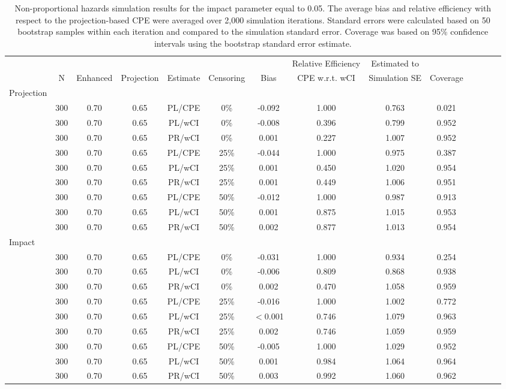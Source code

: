 \documentclass[12pt]{article}
\begin{document}
 
 \begin{table}[ht]
 \caption{Non-proportional hazards simulation results for the impact parameter equal to 0.05.
  The average bias and relative efficiency with respect to the projection-based CPE were averaged over 2,000 simulation iterations. Standard errors were calculated based on 50 bootstrap samples within each iteration and compared to the simulation standard error. Coverage was based on 95\% confidence intervals using the bootstrap standard error estimate. }
\centering
\tiny
\begin{tabular}{lccccccccccccc} \label{NPHsimresultsDelta005}
\vspace{-0.25cm}
   &&&&&& & Relative Efficiency   & Estimated to  &\\
& N & Enhanced &  Projection & Estimate & Censoring &Bias & CPE w.r.t. wCI & Simulation SE & Coverage \\

 \hline
 \hline
  Projection &&&&&&&&& \\
&   300 &0.70 & 0.65 & PL/CPE & 0\% & -0.092 & 1.000 &   0.763 & 0.021 \\ 
& 300 &0.70 & 0.65 & PL/wCI &0\%  & -0.008 & 0.396 & 0.799 & 0.952 \\  
& 300 &0.70 & 0.65 & PR/wCI &0\%  & 0.001 & 0.227 & 1.007 & 0.952 \\ 
\hline
& 300 &0.70 & 0.65 & PL/CPE  &25\% &  -0.044 & 1.000 & 0.975 & 0.387 \\ 
& 300 &0.70 & 0.65 & PL/wCI &25\%  &   0.001 & 0.450 & 1.020 & 0.954 \\ 
& 300 &0.70 & 0.65 & PR/wCI &25\%  &   0.001 & 0.449 & 1.006 & 0.951 \\
\hline
& 300 &0.70 & 0.65 & PL/CPE  &50\%  & -0.012 & 1.000 & 0.987 & 0.913 \\ 
& 300 &0.70 & 0.65 & PL/wCI &50\%  & 0.001 & 0.875 & 1.015 & 0.953 \\
& 300 &0.70 & 0.65 & PR/wCI &50\%  &  0.002 & 0.877 & 1.013 & 0.954 \\  
  \hline
  \hline
  Impact &&&&&&&&& \\
&  300 &0.70 & 0.65 & PL/CPE   &0\%  & -0.031 & 1.000 &  0.934 & 0.254 \\ 
& 300 &0.70 & 0.65 & PL/wCI &0\%  & -0.006 & 0.809 & 0.868 & 0.938 \\ 
& 300 &0.70 & 0.65 & PR/wCI &0\%  & 0.002 & 0.470 & 1.058 & 0.959 \\ 
\hline
&   300 &0.70 & 0.65 & PL/CPE   &25\%  &  -0.016 & 1.000 & 1.002 & 0.772 \\ 
& 300 &0.70 & 0.65 & PL/wCI &25\%  & $<$0.001 & 0.746 & 1.079 & 0.963 \\
& 300 &0.70 & 0.65 & PR/wCI &25\%  & 0.002 & 0.746 & 1.059 & 0.959 \\ 
\hline
& 300 &0.70 & 0.65 & PL/CPE   & 50\%  &  -0.005 & 1.000 & 1.029 & 0.952 \\ 
& 300 &0.70 & 0.65 & PL/wCI &50\% & 0.001 & 0.984 & 1.064 & 0.964 \\ 
& 300 &0.70 & 0.65 & PR/wCI &50\% & 0.003 & 0.992 & 1.060 & 0.962 \\
  \hline
  \hline
\end{tabular}
\end{table}
\end{document}
